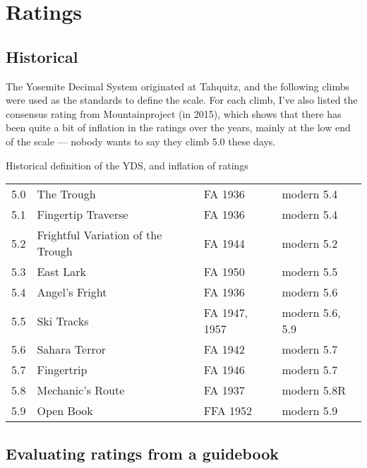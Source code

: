\documentclass{tahquitz}
\begin{document}
\tableofcontents

\vfill\pagebreak


\discussionparindent

\section{Ratings}

\subsection{Historical}

The Yosemite Decimal System originated at Tahquitz, and the following
climbs were used as the standards to define the scale. For each climb, I've also listed the
consensus rating from Mountainproject (in 2015), which shows that there has been
quite a bit of inflation in the ratings over the years, mainly at the low end of the
scale --- nobody wants to say they climb 5.0 these days.

\begin{mytable}{Historical definition of the YDS, and inflation of ratings}
\begin{tabular}{llll}
5.0 & The Trough                        & FA 1936 & modern  5.4 \\
5.1 & Fingertip Traverse                & FA 1936 & modern  5.4 \\
5.2 & Frightful Variation of the Trough & FA 1944 & modern  5.2 \\
5.3 & East Lark                         & FA 1950 & modern  5.5 \\
5.4 & Angel's Fright                    & FA 1936 & modern  5.6 \\
5.5 & Ski Tracks                        & FA 1947, 1957 & modern  5.6, 5.9 \\
5.6 & Sahara Terror                     & FA 1942 & modern  5.7 \\
5.7 & Fingertrip                        & FA 1946 & modern  5.7 \\
5.8 & Mechanic's Route                  & FA 1937 & modern  5.8R \\
5.9 & Open Book                         & FFA 1952 & modern  5.9
\end{tabular}
\end{mytable}

\subsection{Evaluating ratings from a guidebook}
\end{document}
